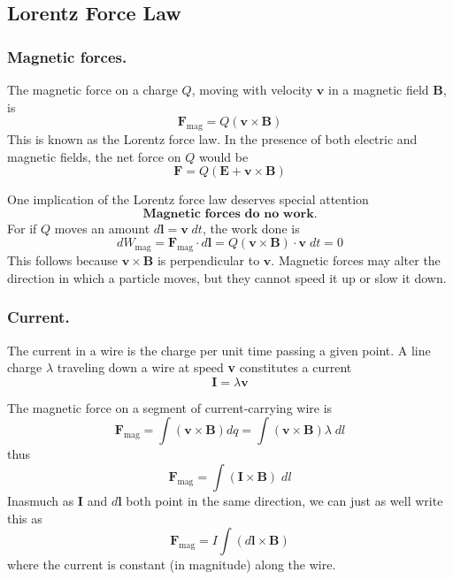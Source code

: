 \documentclass[../../../main.tex]{subfiles}
\begin{document}
\subsection{Lorentz Force Law}
\subsubsection{Magnetic forces.} The magnetic force on a charge $Q$, moving with velocity $\mathbf{v}$ in a magnetic ﬁeld \textbf{B}, is 
\begin{equation*}
    \mathbf{F}_{\text{mag}} = Q(\mathbf{v} \times \mathbf{B})
\end{equation*}
This is known as the Lorentz force law. In the presence of both electric and magnetic ﬁelds, the net force on $Q$ would be
\begin{equation*}
    \mathbf{F}= Q(\mathbf{E}+\mathbf{v} \times \mathbf{B})
\end{equation*}

One implication of the Lorentz force law deserves special attention
\begin{equation*}
\boxed{
    \textbf{Magnetic forces do no work.}
    }
\end{equation*}
For if $Q$ moves an amount $d\mathbf{l} = \mathbf{v} \;dt$, the work done is
\begin{equation*}
    dW_{\text{mag}} = \mathbf{F}_{\text{mag}} \cdot d\mathbf{l} = Q(\mathbf{v} \times \mathbf{B}) \cdot \mathbf{v} \;dt = 0
\end{equation*}
This follows because $\mathbf{v} \times \mathbf{B}$ is perpendicular to $\mathbf{v}$. Magnetic forces may alter the direction in which a particle moves, but they cannot speed it up or slow it down.

\subsubsection{Current.} The current in a wire is the charge per unit time passing a given point. A line charge $\lambda$ traveling down a wire at speed \textbf{v} constitutes a current
\begin{equation*}
    \mathbf{I}=\lambda\mathbf{v}
\end{equation*}

The magnetic force on a segment of current-carrying wire is
\begin{equation*}
    \mathbf{F}_{\text{mag}}=\int (\mathbf{v} \times \mathbf{B}) dq=\int (\mathbf{v} \times \mathbf{B}) \lambda\; dl
\end{equation*}
thus
\begin{equation*}
    \mathbf{F}_{\text{mag}}=\int (\mathbf{I}\times \mathbf{B})\;dl
\end{equation*}
Inasmuch as $\mathbf{I}$ and $d\mathbf{l}$ both point in the same direction, we can just as well write 
this as
\begin{equation*}
    \mathbf{F}_{\text{mag}}=I\int (d\mathbf{l}\times \mathbf{B})
\end{equation*}
where the current is constant (in magnitude) along the wire.
\end{document}
